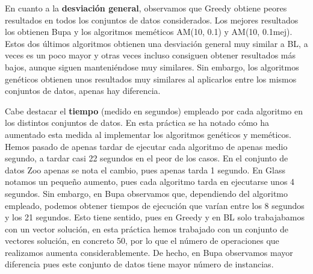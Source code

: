 En cuanto a la \textbf{desviación general}, observamos que Greedy obtiene peores resultados en todos los conjuntos de datos considerados. Los mejores resultados los obtienen Bupa  y los algoritmos meméticos AM(10, 0.1) y AM(10, 0.1mej).
Estos dos últimos algoritmos obtienen una desviación general muy similar a BL, a veces es un poco mayor y otras veces incluso consiguen obtener resultados más bajos, aunque siguen manteniéndose muy similares. Sin embargo, los algoritmos genéticos obtienen unos resultados muy similares al aplicarlos
entre los mismos conjuntos de datos, apenas hay diferencia.

Cabe destacar el \textbf{tiempo} (medido en segundos) empleado por cada algoritmo en los distintos conjuntos de datos. En esta práctica se ha notado cómo ha aumentado esta medida al implementar los algoritmos genéticos y meméticos. Hemos pasado de apenas tardar de ejecutar cada algoritmo de apenas medio segundo, a tardar casi 22 segundos en el peor de los casos.
En el conjunto de datos Zoo apenas se nota el cambio, pues apenas tarda 1 segundo. En Glass notamos un pequeño aumento, pues cada algoritmo tarda en ejecutarse unos 4 segundos. Sin embargo, en Bupa observamos que, dependiendo del algoritmo empleado, podemos obtener tiempos de ejecución que varían entre los 8 segundos y los 21 segundos.
Esto tiene sentido, pues en Greedy y en BL solo trabajabamos con un vector solución, en esta práctica hemos trabajado con un conjunto de vectores solución, en concreto 50, por lo que el número de operaciones que realizamos aumenta considerablemente. De hecho, en Bupa observamos mayor diferencia pues este conjunto de datos tiene mayor número de instancias.

